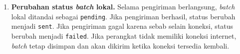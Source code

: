 \begin{enumerate}
    \item \textbf{Perubahan status \textit{batch} lokal.}
    Selama pengiriman berlangsung, \textit{batch} lokal ditandai sebagai \texttt{pending}. 
    Jika pengiriman berhasil, status berubah menjadi \texttt{sent}. 
    Jika pengiriman gagal karena sebab selain koneksi, status berubah menjadi \texttt{failed}. 
    Jika perangkat tidak memiliki koneksi internet, \textit{batch} tetap disimpan dan akan dikirim ketika koneksi tersedia kembali.
\end{enumerate}
